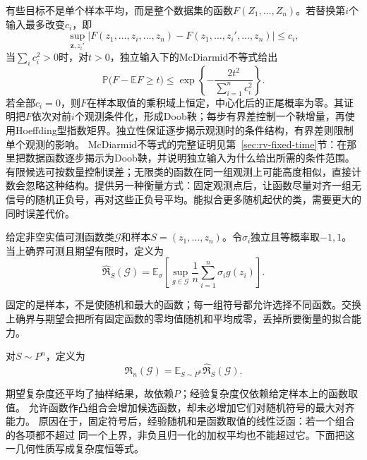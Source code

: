 有些目标不是单个样本平均，而是整个数据集的函数\(F(Z_1,\ldots,Z_n)\)。若替换第\(i\)个输入最多改变\(c_i\)，即
\[ \sup_{\bm{z},z_i'}
  |F(z_1,\ldots,z_i,\ldots,z_n)-F(z_1,\ldots,z_i',\ldots,z_n)|\leq c_i, \]
当\(\sum_i c_i^2>0\)时，对\(t>0\)，独立输入下的McDiarmid不等式给出
\begin{equation}
  \mathbb{P}\bigl(
    F-\mathbb{E}F\geq t
  \bigr)
  \leq
  \exp\left\{
    -\frac{2t^2}{\sum_{i=1}^{n}c_i^2}
  \right\}.
  \label{eq:probability-mcdiarmid}
\end{equation}
若全部\(c_i=0\)，则\(F\)在样本取值的乘积域上恒定，中心化后的正尾概率为零。其证明把\(F\)依次对前\(i\)个观测条件化，形成Doob鞅；每步有界差控制一个鞅增量，再使用Hoeffding型指数矩界。独立性保证逐步揭示观测时的条件结构，有界差则限制单个观测的影响。
McDiarmid不等式的完整证明见第~\ref{sec:rv-fixed-time}节：在那里把数据函数逐步揭示为Doob鞅，并说明独立输入为什么给出所需的条件范围。
有限候选可按数量控制误差；无限类的函数在同一组观测上可能高度相似，直接计数会忽略这种结构。提供另一种衡量方式：固定观测点后，让函数尽量对齐一组无信号的随机正负号，再对这些正负号平均。能拟合更多随机起伏的类，需要更大的同时误差代价。
\begin{definition}[经验Rademacher复杂度]
  \label{def:rademacher-complexity}
  给定非空实值可测函数类\(\mathcal G\)和样本\(S=(z_1,\ldots,z_n)\)。令\(\sigma_i\)独立且等概率取\(-1,1\)。当上确界可测且期望有限时，定义为
  \begin{equation}
    \widehat{\mathfrak R}_S(\mathcal G)
    =\mathbb E_\sigma\left[\sup_{g\in\mathcal G}\frac1n\sum_{i=1}^n\sigma_i g(z_i)\right].
    \label{eq:empirical-rademacher}
  \end{equation}
\end{definition}
固定的是样本，不是使随机和最大的函数；每一组符号都允许选择不同函数。交换上确界与期望会把所有固定函数的零均值随机和平均成零，丢掉所要衡量的拟合能力。
\begin{definition}[期望Rademacher复杂度]
  \label{def:expected-rademacher-complexity}
  对\(S\sim P^n\)，定义为
  \[
    \mathfrak R_n(\mathcal G)=\mathbb E_{S\sim P^n}\widehat{\mathfrak R}_S(\mathcal G).
  \]
\end{definition}
期望复杂度还平均了抽样结果，故依赖\(P\)；经验复杂度仅依赖给定样本上的函数取值。
允许函数作凸组合会增加候选函数，却未必增加它们对随机符号的最大对齐能力。
原因在于，固定符号后，经验随机和是函数取值的线性泛函：若一个组合的各项都不超过
同一个上界，非负且归一化的加权平均也不能超过它。下面把这一几何性质写成复杂度恒等式。

